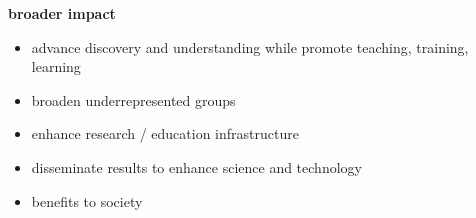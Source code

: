 \documentclass[11pt,letterpaper]{article}
\begin{document}
\textbf{broader impact}

\begin{itemize}
\item advance discovery and understanding while promote teaching, training, learning
\item broaden underrepresented groups
\item enhance research / education infrastructure
\item disseminate results to enhance science and technology
\item benefits to society
\end{itemize}
\end{document}
